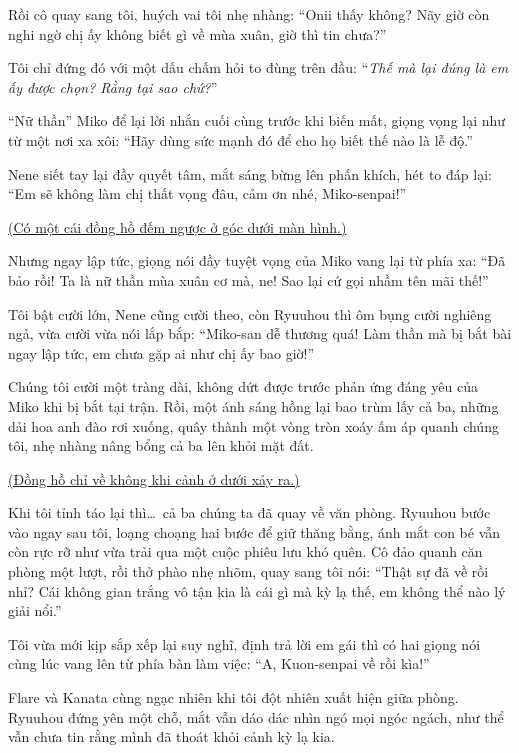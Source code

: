 \documentclass[../main.tex]{subfiles}
\begin{document}
Rồi cô quay sang tôi, huých vai tôi nhẹ nhàng: ``Onii thấy không? Nãy giờ còn nghi ngờ chị ấy không biết gì về mùa xuân, giờ thì tin chưa?''

Tôi chỉ đứng đó với một dấu chấm hỏi to đùng trên đầu: ``\textit{Thế mà lại đúng là em ấy được chọn? Rằng tại sao chứ?}''

``Nữ thần'' Miko để lại lời nhắn cuối cùng trước khi biến mất, giọng vọng lại như từ một nơi xa xôi: ``Hãy dùng sức mạnh đó để cho họ biết thế nào là lễ độ.''

Nene siết tay lại đầy quyết tâm, mắt sáng bừng lên phấn khích, hét to đáp lại: ``Em sẽ không làm chị thất vọng đâu, cảm ơn nhé, Miko-senpai!''

\begin{center}
  \uline{(Có một cái đồng hồ đếm ngược ở góc dưới màn hình.)}
\end{center}

Nhưng ngay lập tức, giọng nói đầy tuyệt vọng của Miko vang lại từ phía xa: ``Đã bảo rồi! Ta là nữ thần mùa xuân cơ mà, ne! Sao lại cứ gọi nhầm tên mãi thế!''

Tôi bật cười lớn, Nene cũng cười theo, còn Ryuuhou thì ôm bụng cười nghiêng ngả, vừa cười vừa nói lắp bắp: ``Miko-san dễ thương quá! Làm thần mà bị bắt bài ngay lập tức, em chưa gặp ai như chị ấy bao giờ!''

Chúng tôi cười một tràng dài, không dứt được trước phản ứng đáng yêu của Miko khi bị bắt tại trận. Rồi, một ánh sáng hồng lại bao trùm lấy cả ba, những dải hoa anh đào rơi xuống, quây thành một vòng tròn xoáy ấm áp quanh chúng tôi, nhẹ nhàng nâng bổng cả ba lên khỏi mặt đất.

\ct

\begin{center}
  \uline{(Đồng hồ chỉ về không khi cảnh ở dưới xảy ra.)}
\end{center}

Khi tôi tỉnh táo lại thì\dots\ cả ba chúng ta đã quay về văn phòng. Ryuuhou bước vào ngay sau tôi, loạng choạng hai bước để giữ thăng bằng, ánh mắt con bé vẫn còn rực rỡ như vừa trải qua một cuộc phiêu lưu khó quên. Cô đảo quanh căn phòng một lượt, rồi thở phào nhẹ nhõm, quay sang tôi nói: ``Thật sự đã về rồi nhỉ? Cái không gian trắng vô tận kia là cái gì mà kỳ lạ thế, em không thể nào lý giải nổi.''

Tôi vừa mới kịp sắp xếp lại suy nghĩ, định trả lời em gái thì có hai giọng nói cùng lúc vang lên từ phía bàn làm việc: ``A, Kuon-senpai về rồi kìa!''

Flare và Kanata cùng ngạc nhiên khi tôi đột nhiên xuất hiện giữa phòng. Ryuuhou đứng yên một chỗ, mắt vẫn dáo dác nhìn ngó mọi ngóc ngách, như thể vẫn chưa tin rằng mình đã thoát khỏi cảnh kỳ lạ kia.
\end{document}
